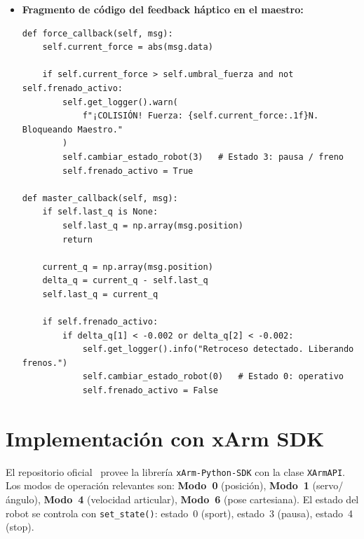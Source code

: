 \documentclass[journal,10pt,twoside]{IEEEtran}
\begin{document}
\begin{itemize}
    \item \textbf{Fragmento de código del feedback háptico en el maestro:}
    \begin{lstlisting}[caption={Retroalimentación háptica implementada en el Maestro}, label={lst:master_haptic}]
def force_callback(self, msg):
    self.current_force = abs(msg.data)

    if self.current_force > self.umbral_fuerza and not self.frenado_activo:
        self.get_logger().warn(
            f"¡COLISIÓN! Fuerza: {self.current_force:.1f}N. Bloqueando Maestro."
        )
        self.cambiar_estado_robot(3)   # Estado 3: pausa / freno
        self.frenado_activo = True

def master_callback(self, msg):
    if self.last_q is None:
        self.last_q = np.array(msg.position)
        return

    current_q = np.array(msg.position)
    delta_q = current_q - self.last_q
    self.last_q = current_q

    if self.frenado_activo:
        if delta_q[1] < -0.002 or delta_q[2] < -0.002:
            self.get_logger().info("Retroceso detectado. Liberando frenos.")
            self.cambiar_estado_robot(0)   # Estado 0: operativo
            self.frenado_activo = False
\end{lstlisting}

\end{itemize}


\section{Implementación con xArm SDK}
\label{sec:implementation}

\begin{theorybox}
  El repositorio oficial~\cite{xarm_github} provee la librería
  \texttt{xArm-Python-SDK} con la clase \texttt{XArmAPI}.
  Los modos de operación relevantes son:
  \textbf{Modo~0} (posición), \textbf{Modo~1} (servo/ángulo),
  \textbf{Modo~4} (velocidad articular), \textbf{Modo~6} (pose cartesiana).
  El estado del robot se controla con \texttt{set\_state()}:
  estado~0 (sport), estado~3 (pausa), estado~4 (stop).
\end{theorybox}
\end{document}
